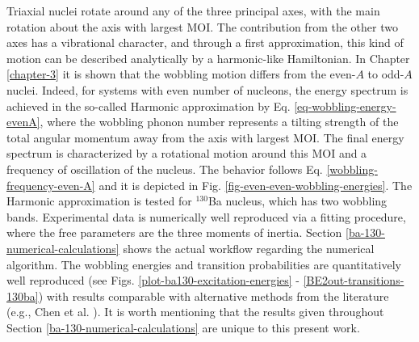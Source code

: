 Triaxial nuclei rotate around any of the three principal axes, with the main rotation about the axis with largest MOI. The contribution from the other two axes has a vibrational character, and through a first approximation, this kind of motion can be described analytically by a harmonic-like Hamiltonian. In Chapter \ref{chapter-3} it is shown that the wobbling motion differs from the even-$A$ to odd-$A$ nuclei. Indeed, for systems with even number of nucleons, the energy spectrum is achieved in the so-called Harmonic approximation by Eq. \ref{eq-wobbling-energy-evenA}, where the wobbling phonon number represents a tilting strength of the total angular momentum away from the axis with largest MOI. The final energy spectrum is characterized by a rotational motion around this MOI and a frequency of oscillation of the nucleus. The behavior follows Eq. \ref{wobbling-frequency-even-A} and it is depicted in Fig. \ref{fig-even-even-wobbling-energies}. The Harmonic approximation is tested for $^{130}$Ba nucleus, which has two wobbling bands. Experimental data is numerically well reproduced via a fitting procedure, where the free parameters are the three moments of inertia. Section \ref{ba-130-numerical-calculations} shows the actual workflow regarding the numerical algorithm. The wobbling energies and transition probabilities are quantitatively well reproduced (see Figs. \ref{plot-ba130-excitation-energies} - \ref{BE2out-transitions-130ba}) with results comparable with alternative methods from the literature (e.g., Chen et al. \cite{chen2019transverse}). It is worth mentioning that the results given throughout Section \ref{ba-130-numerical-calculations} are unique to this present work. 

